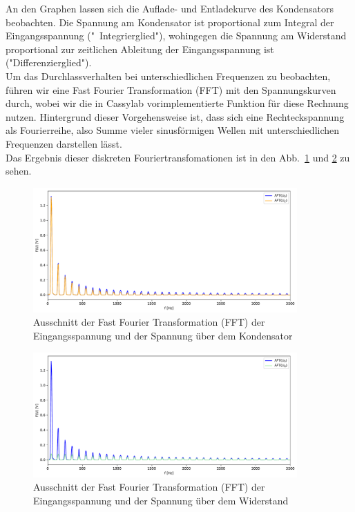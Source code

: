 \documentclass[12pt,a4paper]{article}
\begin{document}
An den Graphen lassen sich die Auflade- und Entladekurve des Kondensators beobachten. Die Spannung am Kondensator ist proportional zum Integral der Eingangsspannung ("\ Integrierglied"), wohingegen die Spannung am Widerstand proportional zur zeitlichen Ableitung der Eingangsspannung ist ("Differenzierglied").\\
Um das Durchlassverhalten bei unterschiedlichen Frequenzen zu beobachten, führen wir eine Fast Fourier Transformation (FFT) mit den Spannungskurven durch, wobei wir die in Cassylab vorimplementierte Funktion für diese Rechnung nutzen. Hintergrund dieser Vorgehensweise ist, dass sich eine Rechteckspannung als Fourierreihe, also Summe vieler sinusförmigen Wellen mit unterschiedlichen Frequenzen darstellen lässt.\\
Das Ergebnis dieser diskreten Fouriertransfomationen ist in den Abb.~\ref{FFT_C} und \ref{FFT_R} zu sehen.
\begin{figure}[H]
	\centering
	\includegraphics[width=0.9\textwidth]{Python/Fourier_UC_Rohdaten.pdf}
	\caption{Ausschnitt der Fast Fourier Transformation (FFT) der Eingangsspannung und der Spannung über dem Kondensator}
	\label{FFT_C}
\end{figure}
\begin{figure}[H]
	\centering
	\includegraphics[width=0.9\textwidth]{Python/Fourier_UR_Rohdaten.pdf}
	\caption{Ausschnitt der Fast Fourier Transformation (FFT) der Eingangsspannung und der Spannung über dem Widerstand}
	\label{FFT_R}
\end{figure}
\end{document}
